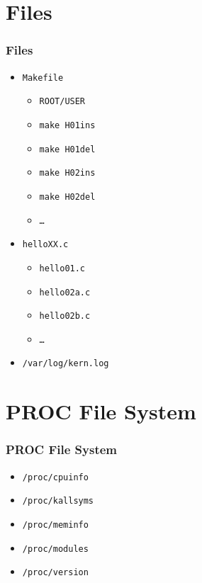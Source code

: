 \documentclass[aspectratio=169, xcolor=table, notheorems, hyperref={pdfpagelabels=false}]{beamer}
\begin{document}
\section{Files}
\begin{frame}[fragile]
\frametitle{Files}
\begin{itemize}
\item \texttt{Makefile}
\begin{itemize}
\item \texttt{ROOT/USER}
\item \texttt{make H01ins}
\item \texttt{make H01del}
\item \texttt{make H02ins}
\item \texttt{make H02del}
\item \texttt{\ldots}
\end{itemize}
\item \texttt{helloXX.c}
\begin{itemize}
\item \texttt{hello01.c}
\item \texttt{hello02a.c}
\item \texttt{hello02b.c}
\item \texttt{\ldots}
\end{itemize}
\item \texttt{/var/log/kern.log}
\end{itemize}
\end{frame}

\section{PROC File System}
\begin{frame}[fragile]
\frametitle{PROC File System}
\begin{itemize}
\item \texttt{/proc/cpuinfo}
\item \texttt{/proc/kallsyms}
\item \texttt{/proc/meminfo}
\item \texttt{/proc/modules}
\item \texttt{/proc/version}
\end{itemize}
\end{frame}

\end{document}

